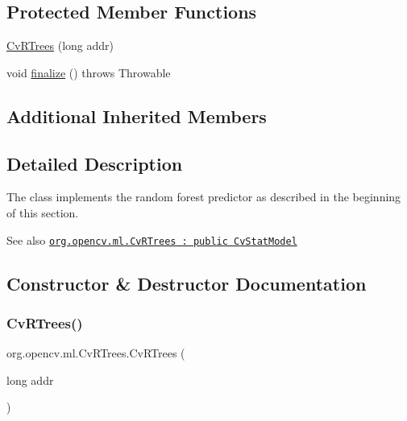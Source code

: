 \subsection*{Protected Member Functions}
\begin{DoxyCompactItemize}
\item 
\mbox{\hyperlink{classorg_1_1opencv_1_1ml_1_1_cv_r_trees_a1ec5fd88a388610b146894ffaa342e88}{Cv\+R\+Trees}} (long addr)
\item 
void \mbox{\hyperlink{classorg_1_1opencv_1_1ml_1_1_cv_r_trees_a311e7fe10c8a4d315708eaf45bcf44ac}{finalize}} ()  throws Throwable 
\end{DoxyCompactItemize}
\subsection*{Additional Inherited Members}


\subsection{Detailed Description}
The class implements the random forest predictor as described in the beginning of this section.

\begin{DoxySeeAlso}{See also}
\href{http://docs.opencv.org/modules/ml/doc/random_trees.html#cvrtrees}{\tt org.\+opencv.\+ml.\+Cv\+R\+Trees \+: public Cv\+Stat\+Model} 
\end{DoxySeeAlso}


\subsection{Constructor \& Destructor Documentation}
\mbox{\label{classorg_1_1opencv_1_1ml_1_1_cv_r_trees_a1ec5fd88a388610b146894ffaa342e88}} 
\subsubsection{\texorpdfstring{Cv\+R\+Trees()}{CvRTrees()}\hspace{0.1cm}{\footnotesize\ttfamily [1/2]}}
{\footnotesize\ttfamily org.\+opencv.\+ml.\+Cv\+R\+Trees.\+Cv\+R\+Trees (\begin{DoxyParamCaption}\item[{long}]{addr }\end{DoxyParamCaption})\hspace{0.3cm}{\ttfamily [protected]}}

